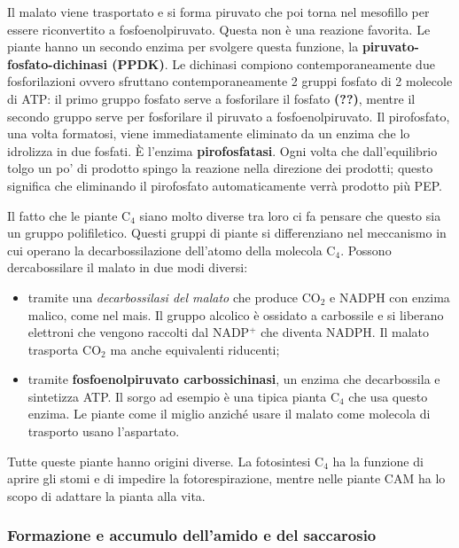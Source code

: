 \documentclass[]{article}
\begin{document}
Il malato viene trasportato e si forma piruvato che poi torna nel
mesofillo per essere riconvertito a fosfoenolpiruvato. Questa non è una
reazione favorita. Le piante hanno un secondo enzima per svolgere questa
funzione, la \textbf{piruvato-fosfato-dichinasi (PPDK)}. Le dichinasi
compiono contemporaneamente due fosforilazioni ovvero sfruttano
contemporaneamente 2 gruppi fosfato di 2 molecole di ATP: il primo
gruppo fosfato serve a fosforilare il fosfato \textbf{(??)}, mentre il
secondo gruppo serve per fosforilare il piruvato a fosfoenolpiruvato. Il
pirofosfato, una volta formatosi, viene immediatamente eliminato da un
enzima che lo idrolizza in due fosfati. È l'enzima
\textbf{pirofosfatasi}. Ogni volta che dall'equilibrio tolgo un po' di
prodotto spingo la reazione nella direzione dei prodotti; questo
significa che eliminando il pirofosfato automaticamente verrà prodotto
più PEP.

Il fatto che le piante C$_4$ siano molto diverse tra loro ci fa pensare
che questo sia un gruppo polifiletico. Questi gruppi di piante si
differenziano nel meccanismo in cui operano la decarbossilazione
dell'atomo della molecola C$_4$. Possono dercabossilare il malato in due
modi diversi:

\begin{itemize}
\item
  tramite una \emph{decarbossilasi del malato} che produce CO$_2$ e
  NADPH con enzima malico, come nel mais. Il gruppo alcolico è ossidato
  a carbossile e si liberano elettroni che vengono raccolti dal NADP$^+$
  che diventa NADPH. Il malato trasporta CO$_2$ ma anche equivalenti
  riducenti;
\item
  tramite \textbf{fosfoenolpiruvato carbossichinasi}, un enzima che
  decarbossila e sintetizza ATP. Il sorgo ad esempio è una tipica pianta
  C$_4$ che usa questo enzima. Le piante come il miglio anziché usare il
  malato come molecola di trasporto usano l'aspartato.
\end{itemize}

Tutte queste piante hanno origini diverse. La fotosintesi C$_4$ ha la
funzione di aprire gli stomi e di impedire la fotorespirazione, mentre
nelle piante CAM ha lo scopo di adattare la pianta alla vita.

\subsubsection{Formazione e accumulo dell'amido e del
saccarosio}\label{formazione-e-accumulo-dellamido-e-del-saccarosio}
\end{document}
